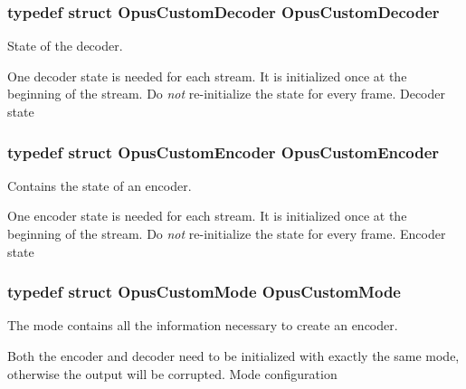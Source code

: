 \subsubsection[{\texorpdfstring{Opus\+Custom\+Decoder}{OpusCustomDecoder}}]{\setlength{\rightskip}{0pt plus 5cm}typedef struct {\bf Opus\+Custom\+Decoder} {\bf Opus\+Custom\+Decoder}}\hypertarget{group__opus__custom_gacae60f89c5ce7aeea69503451b9e2e6f}{}\label{group__opus__custom_gacae60f89c5ce7aeea69503451b9e2e6f}


State of the decoder. 

One decoder state is needed for each stream. It is initialized once at the beginning of the stream. Do {\itshape not} re-\/initialize the state for every frame. Decoder state 
\subsubsection[{\texorpdfstring{Opus\+Custom\+Encoder}{OpusCustomEncoder}}]{\setlength{\rightskip}{0pt plus 5cm}typedef struct {\bf Opus\+Custom\+Encoder} {\bf Opus\+Custom\+Encoder}}\hypertarget{group__opus__custom_ga7abe6a7afc599667950251c987feb439}{}\label{group__opus__custom_ga7abe6a7afc599667950251c987feb439}


Contains the state of an encoder. 

One encoder state is needed for each stream. It is initialized once at the beginning of the stream. Do {\itshape not} re-\/initialize the state for every frame. Encoder state 
\subsubsection[{\texorpdfstring{Opus\+Custom\+Mode}{OpusCustomMode}}]{\setlength{\rightskip}{0pt plus 5cm}typedef struct {\bf Opus\+Custom\+Mode} {\bf Opus\+Custom\+Mode}}\hypertarget{group__opus__custom_gaf33847c711195b9edef896b73c96ec4f}{}\label{group__opus__custom_gaf33847c711195b9edef896b73c96ec4f}


The mode contains all the information necessary to create an encoder. 

Both the encoder and decoder need to be initialized with exactly the same mode, otherwise the output will be corrupted. Mode configuration 

